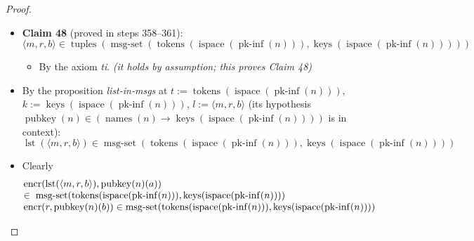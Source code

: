 \documentclass[11pt]{article}
\theoremstyle{plain}
\begin{document}
\begin{proof}
\begin{itemize}[leftmargin=2.8em, itemsep=4pt, parsep=1pt]
\begin{itemize}[leftmargin=2.8em, itemsep=4pt, parsep=1pt]
  \item[\textbf{357}] \textbf{Claim 48} (proved in steps 358--361):
\begin{equation*}
\langle m, r, b \rangle \in \operatorname{tuples}(\operatorname{msg\text{-}set}(\operatorname{tokens}(\operatorname{ispace}(\operatorname{pk\text{-}inf}(n))), \operatorname{keys}(\operatorname{ispace}(\operatorname{pk\text{-}inf}(n)))))
\end{equation*}

  \begin{itemize}[leftmargin=2.8em, itemsep=4pt, parsep=1pt]
  \item[\textbf{358--361}] By the axiom \emph{ti}.  \emph{(it holds by assumption; this proves Claim 48)}
  \end{itemize}
  \item[\textbf{362}] By the proposition \emph{list-in-msgs} at $t := \operatorname{tokens}(\operatorname{ispace}(\operatorname{pk\text{-}inf}(n)))$, $k := \operatorname{keys}(\operatorname{ispace}(\operatorname{pk\text{-}inf}(n)))$, $l := \langle m, r, b \rangle$ (its hypothesis $\operatorname{pubkey}(n) \in (\operatorname{names}(n) \to \operatorname{keys}(\operatorname{ispace}(\operatorname{pk\text{-}inf}(n))))$ is in context):
\begin{equation*}
\operatorname{lst}(\langle m, r, b \rangle) \in \operatorname{msg\text{-}set}(\operatorname{tokens}(\operatorname{ispace}(\operatorname{pk\text{-}inf}(n))), \operatorname{keys}(\operatorname{ispace}(\operatorname{pk\text{-}inf}(n))))
\end{equation*}

  \item[\textbf{363--364}] Clearly
\begin{equation*}
\begin{array}{@{}l@{}}
\begin{array}{@{}l@{}} \operatorname{encr}(\operatorname{lst}(\langle m, r, b \rangle), \operatorname{pubkey}(n)(a)) \\ \in\; \operatorname{msg\text{-}set}(\operatorname{tokens}(\operatorname{ispace}(\operatorname{pk\text{-}inf}(n))), \operatorname{keys}(\operatorname{ispace}(\operatorname{pk\text{-}inf}(n)))) \end{array} \\
\operatorname{encr}(r, \operatorname{pubkey}(n)(b)) \in \operatorname{msg\text{-}set}(\operatorname{tokens}(\operatorname{ispace}(\operatorname{pk\text{-}inf}(n))), \operatorname{keys}(\operatorname{ispace}(\operatorname{pk\text{-}inf}(n))))
\end{array}
\end{equation*}


\end{itemize}
\end{itemize}
\end{proof}
\end{document}
